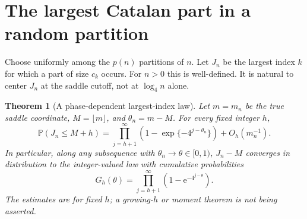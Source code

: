 \documentclass[11pt,a4paper]{article}
\numberwithin{equation}{section}
\newtheorem{theorem}{Theorem}[section]
\theoremstyle{definition}
\theoremstyle{remark}
\newcommand{\e}{\mathrm e}
\newcommand{\PP}{\mathbb P}
\begin{document}
\section{The largest Catalan part in a random partition}
\label{ctp:sec:largest}
Choose uniformly among the $p(n)$ partitions of $n$. Let $J_n$ be the
largest index $k$ for which a part of size $c_k$ occurs. For $n>0$ this
is well-defined. It is natural to center $J_n$ at the saddle cutoff, not
at $\log_4 n$ alone.

\begin{theorem}[A phase-dependent largest-index law]\label{ctp:thm:largest}
Let $m=m_n$ be the true saddle coordinate, $M=\lfloor m\rfloor$, and
$\theta_n=m-M$. For every fixed integer $h$,
\begin{equation}\label{ctp:eq:largest-law}
 \PP(J_n\leq M+h)=
 \prod_{j=h+1}^{\infty}\left(1-\exp\{-4^{j-\theta_n}\}\right)
 +O_h(m_n^{-1}).
\end{equation}
In particular, along any subsequence with $\theta_n\to\theta\in[0,1)$,
$J_n-M$ converges in distribution to the integer-valued law with cumulative
probabilities
\begin{equation}\label{ctp:eq:largest-cdf}
 G_h(\theta)=\prod_{j=h+1}^{\infty}(1-\e^{-4^{j-\theta}}).
\end{equation}
The estimates are for fixed $h$; a growing-$h$ or moment theorem is not
being asserted.
\end{theorem}
\end{document}
